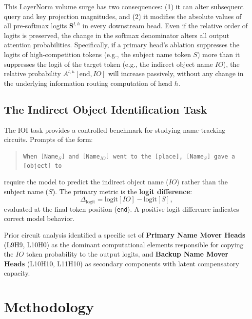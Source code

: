 \documentclass[12pt,a4paper]{article}
\begin{document}
This LayerNorm volume surge has two consequences: (1) it can alter subsequent query and key projection magnitudes, and (2) it modifies the
absolute values of all pre-softmax logits $\mathbf{S}^{l,h}$ in every downstream
head. Even if the relative order of logits is preserved, the change in the
softmax denominator alters all output attention probabilities. Specifically, if
a primary head's ablation suppresses the logits of high-competition tokens
(e.g., the subject name token $S$) more than it suppresses the logit of the
target token (e.g., the indirect object name $IO$), the relative probability
$A^{l,h}[\text{end}, IO]$ will increase passively, without any change in the
underlying information routing computation of head $h$.

\subsection{The Indirect Object Identification Task}
\label{subsec:ioi}

The IOI task \citep{wang2022interpretability} provides a controlled benchmark
for studying name-tracking circuits. Prompts of the form:
\begin{quote}
  \texttt{When [Name$_S$] and [Name$_{IO}$] went to the [place],
  [Name$_S$] gave a [object] to}
\end{quote}
require the model to predict the indirect object name ($IO$) rather than the
subject name ($S$). The primary metric is the \textbf{logit difference}:
\begin{equation}
  \Delta_{\text{logit}} = \text{logit}[IO] - \text{logit}[S],
  \label{eq:logitdiff}
\end{equation}
evaluated at the final token position (\texttt{end}). A positive logit
difference indicates correct model behavior.

Prior circuit analysis \citep{wang2022interpretability} identified a specific
set of \textbf{Primary Name Mover Heads} (L9H9, L10H0) as the dominant
computational elements responsible for copying the $IO$ token probability to
the output logits, and \textbf{Backup Name Mover Heads} (L10H10, L11H10) as
secondary components with latent compensatory capacity.

\section{Methodology}
\label{sec:method}
\end{document}
